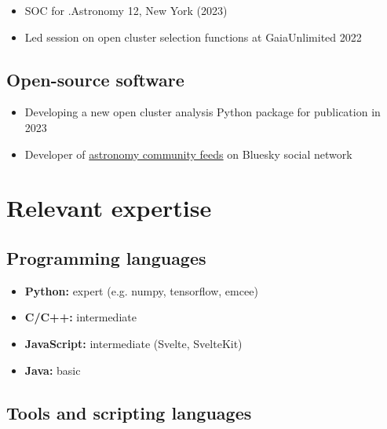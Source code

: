 \documentclass[12pt, letterpaper]{hunt-cv}
\begin{document}
\begin{itemize}
    \item SOC for .Astronomy 12, New York (2023)
    \item Led session on open cluster selection functions at GaiaUnlimited 2022
\end{itemize}

\subsection*{Open-source software \href{\cvGitHubLink}{\faGithub}}

\begin{itemize}
    \item Developing a new open cluster analysis Python package for publication in 2023
    \item Developer of \href{https://github.com/emilyhunt/bluesky-astronomy-feeds}{astronomy community feeds} on Bluesky social network
\end{itemize}





\section*{Relevant expertise}

\subsection*{Programming languages}

\begin{itemize}
    \item \textbf{Python:} expert (e.g. numpy, tensorflow, emcee)
    \item \textbf{C/C++:} intermediate
    \item \textbf{JavaScript:} intermediate (Svelte, SvelteKit)
    \item \textbf{Java:} basic
\end{itemize}

\subsection*{Tools and scripting languages}
\end{document}
